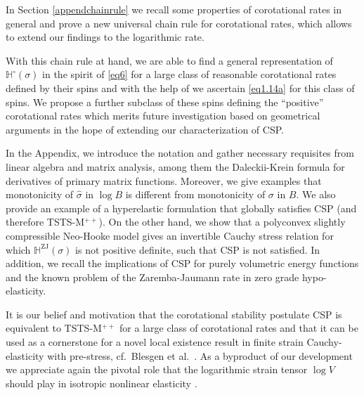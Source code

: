 \documentclass[10pt]{article}
\numberwithin{theoremCounter}{section}
\theoremstyle{plain}
\theoremstyle{definition}
\DeclareMathOperator{\ZJ}{ZJ}
\def\H{\mathbb{H}}
\numberwithin{equation}{section}
\begin{document}
In Section \ref{appendchainrule} we recall some properties of corotational rates in general and prove a new universal chain rule for corotational rates, which allows to extend our findings to the logarithmic rate. 

With this chain rule at hand, we are able to find a general representation of $\H^{\circ}(\sigma)$ in the spirit of \eqref{eq6} for a large class of reasonable corotational rates defined by their spins and with the help of \cite{neffkoro2024} we ascertain \eqref{eq1.14a} for this class of spins. We propose a further subclass of these spins defining the \enquote{positive} corotational rates which merits future investigation based on geometrical arguments in the hope of extending our characterization of CSP.

In the Appendix, we introduce the notation and gather necessary requisites from linear algebra and matrix analysis, among them the Daleckii-Krein formula for derivatives of primary matrix functions. Moreover, we give examples that monotonicity of $\widehat{\sigma}$ in $\log B$ is different from monotonicity of $\sigma$ in $B$. We also provide an example of a hyperelastic formulation that globally satisfies CSP (and therefore TSTS-M$^{++}$). On the other hand, we show that a polyconvex slightly compressible Neo-Hooke model gives an invertible Cauchy stress relation for which $\H^{\ZJ}(\sigma)$ is not positive definite, such that CSP is not satisfied. In addition, we recall the implications of CSP for purely volumetric energy functions and the known problem of the Zaremba-Jaumann rate in zero grade hypo-elasticity. 

It is our belief and motivation that the corotational stability postulate CSP is equivalent to TSTS-M$^{++}$ for a large class of corotational rates and that it can be used as a cornerstone for a novel local existence result in finite strain Cauchy-elasticity with pre-stress, cf.~Blesgen et al.~\cite{blesgen2024}. As a byproduct of our development we appreciate again the pivotal role that the logarithmic strain tensor $\log V$ should play in isotropic nonlinear elasticity \cite{Becker1893,  Hencky1928, martin2018history, NeffGhibaLankeit, NeffGhibaPoly, nefftranslationbecker}.
\end{document}
